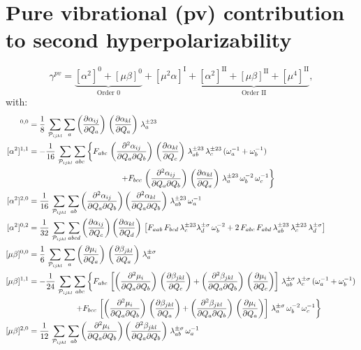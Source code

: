 \documentclass[12pt,a4paper]{article}
\begin{document}
\section{Pure vibrational (pv) contribution to second hyperpolarizability}
\begin{equation}
\gamma^{pv} = \underbrace{[\alpha^2]^0 + [\mu\beta]^0}_\text{Order 0} + [\mu^2\alpha]^\text{I} + \underbrace{[\alpha^2]^\text{II} + [\mu\beta]^\text{II} + [\mu^4]^\text{II}}_\text{Order II},
\end{equation}
with:
\begin{align}
[\alpha^2]^{0,0} &= \frac{1}{8}\,\sum_{\mathcal{P}_{ijkl}} \sum_a\tdiff{\alpha_{ij}}{Q_a}\,\tdiff{\alpha_{kl}}{Q_a}\,\lb{23}{a} \\
[\alpha^2]^{1,1} &= -\frac{1}{16}\,\sum_{\mathcal{P}_{ijkl}} \sum_{abc} \left\{ F_{abc}\,
\tdiff{^2\alpha_{ij}}{Q_a\partial Q_b}\,\tdiff{\alpha_{kl}}{Q_c}\,
\lb{23}{ab}\,\lb{23}{c}\,(\omega_a^{-1}+\omega_b^{-1})\right.\nonumber\\
&\hspace{4cm}\left. + F_{bcc}\,\tdiff{^2\alpha_{ij}}{Q_a\partial Q_b}\,\tdiff{\alpha_{kl}}{Q_a}\,
\lb{23}{a}\,\omega_b^{-2}\,\omega_c^{-1} \right\}\\
%
[\alpha^2]^{2,0} &= \frac{1}{16}\,\sum_{\mathcal{P}_{ijkl}} \sum_{ab} \tdiff{^2\alpha_{ij}}{Q_a\partial Q_b}\tdiff{^2\alpha_{kl}}{Q_a\partial Q_b}\,\lb{23}{ab}\,\omega_a^{-1}\\
[\alpha^2]^{0,2} &= \frac{1}{32}\,\sum_{\mathcal{P}_{ijkl}} \sum_{abcd} \tdiff{\alpha_{ij}}{Q_c}\tdiff{\alpha_{kl}}{Q_d}\,\left[F_{aab}\,F_{bcd}\,\lb{23}{c}\lb{\sigma}{d}\,\omega_b^{-2}+2\,F_{abc}\,F_{abd}\,\lb{23}{ab}\,\lb{23}{c}\,\lb{\sigma}{d}\right] \\
%
[\mu\beta]^{0,0} &= \frac{1}{6}\,\sum_{\mathcal{P}_{ijkl}} \sum_a \tdiff{\mu_i}{Q_a}\,\tdiff{\beta_{jkl}}{Q_a}\,\lb{\sigma}{a}\\
[\mu\beta]^{1,1} &= -\frac{1}{24}\,\sum_{\mathcal{P}_{ijkl}} \sum_{abc}\left\{ F_{abc}\,\left[\tdiff{^2\mu_i}{Q_a\partial Q_b}\,\tdiff{\beta_{jkl}}{Q_c}+\tdiff{^2\beta_{jkl}}{Q_a\partial Q_b}\,\tdiff{\mu_i}{Q_c}\right]\,\lb{\sigma}{ab}\,\lb{\sigma}{c}\,(\omega_a^{-1}+\omega_b^{-1})\right.\nonumber\\
&\hspace{2cm}\left.+ F_{bcc}\,\left[\tdiff{^2\mu_i}{Q_a\partial Q_b}\,\tdiff{\beta_{jkl}}{Q_a}+\tdiff{^2\beta_{jkl}}{Q_a\partial Q_b}\,\tdiff{\mu_i}{Q_a}\right]\,\lb{\sigma}{a}\,\omega_b^{-2}\,\omega_c^{-1}\right\}\\
%
[\mu\beta]^{2,0} &= \frac{1}{12}\,\sum_{\mathcal{P}_{ijkl}} \sum_{ab} \tdiff{^2\mu_i}{Q_a\partial Q_b}\tdiff{^2\beta_{jkl}}{Q_a\partial Q_b}\,\lb{\sigma}{ab}\,\omega_a^{-1}\\

\end{align}
\end{document}
